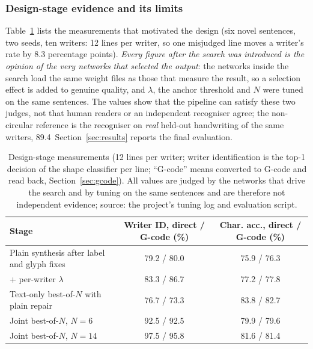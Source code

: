 \subsubsection{Design-stage evidence and its limits}

Table~\ref{tab:syn-evid} lists the measurements that motivated the design (six novel sentences, two seeds, ten writers: 12 lines per writer, so one misjudged line moves a writer's rate by 8.3 percentage points).
\emph{Every figure after the search was introduced is the opinion of the very networks that selected the output}: the networks inside the search load the same weight files as those that measure the result, so a selection effect is added to genuine quality, and $\lambda$, the anchor threshold and $N$ were tuned on the same sentences.
The values show that the pipeline can satisfy these two judges, not that human readers or an independent recogniser agree; the non-circular reference is the recogniser on \emph{real} held-out handwriting of the same writers, 89.4\,%
Section~\ref{sec:results} reports the final evaluation.

\begin{table}[!htbp]
\centering
\fontsize{9.5}{11.5}\selectfont
\begin{tabularx}{\linewidth}{|X|c|c|}
\hline
\textbf{Stage} & \textbf{Writer ID, direct / G-code (\%)} & \textbf{Char. acc., direct / G-code (\%)} \\
\hline
Plain synthesis after label and glyph fixes & 79.2 / 80.0 & 75.9 / 76.3 \\
\hline
+ per-writer $\lambda$ & 83.3 / 86.7 & 77.2 / 77.8 \\
\hline
Text-only best-of-$N$ with plain repair & 76.7 / 73.3 & 83.8 / 82.7 \\
\hline
Joint best-of-$N$, $N=6$ & 92.5 / 92.5 & 79.9 / 79.6 \\
\hline
Joint best-of-$N$, $N=14$ & 97.5 / 95.8 & 81.6 / 81.4 \\
\hline
\end{tabularx}
\caption{Design-stage measurements (12 lines per writer; writer identification is the top-1 decision of the shape classifier per line; ``G-code'' means converted to G-code and read back, Section~\ref{sec:gcode}). All values are judged by the networks that drive the search and by tuning on the same sentences and are therefore not independent evidence; source: the project's tuning log and evaluation script.}
\label{tab:syn-evid}
\end{table}

